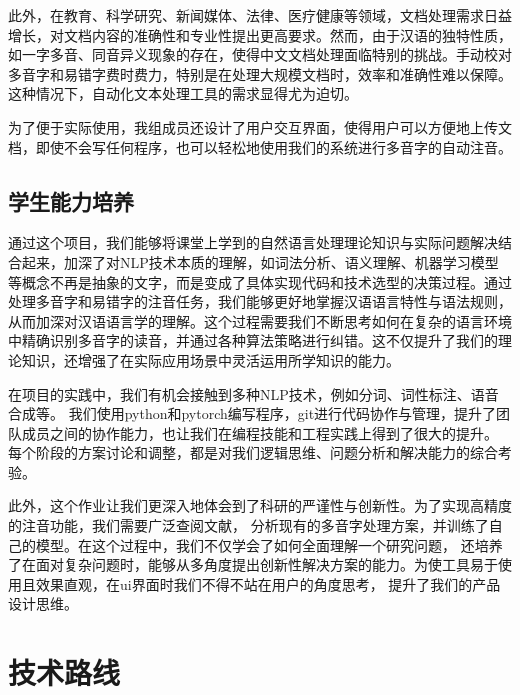 \documentclass[12pt,hyperref,a4paper,UTF8]{ctexart}
\begin{document}
此外，在教育、科学研究、新闻媒体、法律、医疗健康等领域，文档处理需求日益增长，对文档内容的准确性和专业性提出更高要求。然而，由于汉语的独特性质，如一字多音、同音异义现象的存在，使得中文文档处理面临特别的挑战。手动校对多音字和易错字费时费力，特别是在处理大规模文档时，效率和准确性难以保障。这种情况下，自动化文本处理工具的需求显得尤为迫切。

为了便于实际使用，我组成员还设计了用户交互界面，使得用户可以方便地上传文档，即使不会写任何程序，也可以轻松地使用我们的系统进行多音字的自动注音。
\subsection{学生能力培养}
通过这个项目，我们能够将课堂上学到的自然语言处理理论知识与实际问题解决结合起来，加深了对NLP技术本质的理解，如词法分析、语义理解、机器学习模型等概念不再是抽象的文字，而是变成了具体实现代码和技术选型的决策过程。通过处理多音字和易错字的注音任务，我们能够更好地掌握汉语语言特性与语法规则，从而加深对汉语语言学的理解。这个过程需要我们不断思考如何在复杂的语言环境中精确识别多音字的读音，并通过各种算法策略进行纠错。这不仅提升了我们的理论知识，还增强了在实际应用场景中灵活运用所学知识的能力。

在项目的实践中，我们有机会接触到多种NLP技术，例如分词、词性标注、语音合成等。
我们使用python和pytorch编写程序，git进行代码协作与管理，提升了团队成员之间的协作能力，也让我们在编程技能和工程实践上得到了很大的提升。
每个阶段的方案讨论和调整，都是对我们逻辑思维、问题分析和解决能力的综合考验。

此外，这个作业让我们更深入地体会到了科研的严谨性与创新性。为了实现高精度的注音功能，我们需要广泛查阅文献，
分析现有的多音字处理方案，并训练了自己的模型。在这个过程中，我们不仅学会了如何全面理解一个研究问题，
还培养了在面对复杂问题时，能够从多角度提出创新性解决方案的能力。为使工具易于使用且效果直观，在ui界面时我们不得不站在用户的角度思考，
提升了我们的产品设计思维。
\section{技术路线}
\end{document}
